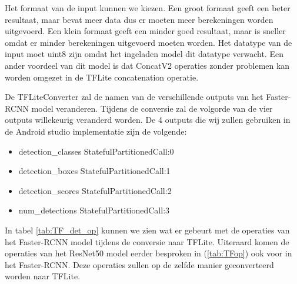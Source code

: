 Het formaat van de input kunnen we kiezen.
Een groot formaat geeft een beter resultaat, maar bevat meer data dus er moeten meer berekeningen worden uitgevoerd.
Een klein formaat geeft een minder goed resultaat, maar is sneller omdat er minder berekeningen uitgevoerd moeten worden.
Het datatype van de input moet uint8 zijn omdat het ingeladen model dit datatype verwacht.
Een ander voordeel van dit model is dat ConcatV2 operaties zonder problemen kan worden omgezet in de TFLite concatenation operatie.

De TFLiteConverter zal de namen van de verschillende outputs van het Faster-RCNN model veranderen.
Tijdens de conversie zal de volgorde van de vier outputs willekeurig veranderd worden.
De 4 outputs die wij zullen gebruiken in de Android studio implementatie zijn de volgende:

\begin{itemize}
	\item detection\_classes \textrightarrow StatefulPartitionedCall:0
	\item detection\_boxes \textrightarrow StatefulPartitionedCall:1
	\item detection\_scores \textrightarrow StatefulPartitionedCall:2
    \item num\_detections \textrightarrow StatefulPartitionedCall:3
\end{itemize}

In tabel \ref{tab:TF_det_op} kunnen we zien wat er gebeurt met de operaties van het Faster-RCNN model tijdens de conversie naar TFLite.
Uiteraard komen de operaties van het ResNet50 model eerder besproken in (\ref{tab:TFop}) ook voor in het Faster-RCNN.
Deze operaties zullen op de zelfde manier geconverteerd worden naar TFLite.

